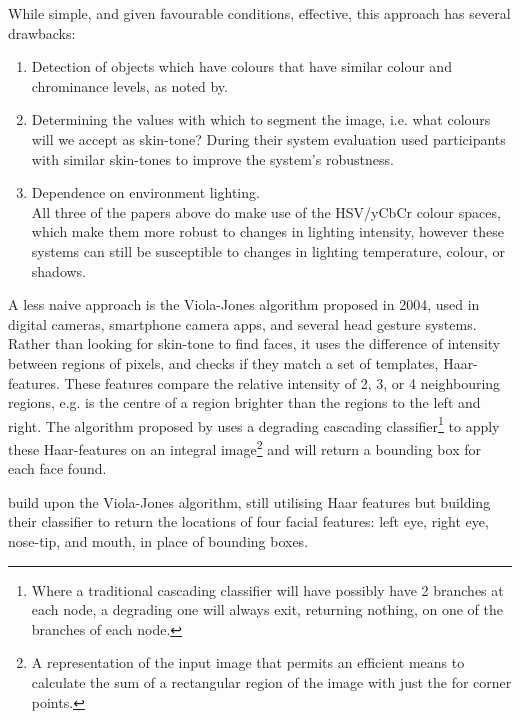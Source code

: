 While simple, and given favourable conditions, effective, this approach has several drawbacks:
\begin{enumerate}
    \item Detection of objects which have colours that have similar colour and chrominance levels, as noted by\citeauthor{bin2007rgb}\cite{bin2007rgb}.
    \item Determining the values with which to segment the image, i.e. what colours will we accept as skin-tone? During their system evaluation \citeauthor{chan2004face}\cite{chan2004face} used participants with similar skin-tones to improve the system's robustness.
    \item Dependence on environment lighting.\\
        All three of the papers above\cite{huang2004robust,bin2007rgb,chan2004face} do make use of the HSV/yCbCr colour spaces, which make them more robust to changes in lighting intensity, however these systems can still be susceptible to changes in lighting temperature, colour, or shadows.
\end{enumerate}\nl
A less naive approach is the Viola-Jones algorithm proposed in 2004\cite{viola2004robust}, used in digital cameras, smartphone camera apps, and several head gesture systems\cite{kim2017real, neto2012real, francone2011using}.
Rather than looking for skin-tone to find faces, it uses the difference of intensity between regions of pixels, and checks if they match a set of templates, Haar-features. These features compare the relative intensity of 2, 3, or 4 neighbouring regions, e.g. is the centre of a region brighter than the regions to the left and right. 
The algorithm proposed by \citeauthor{viola2004robust} uses a degrading cascading classifier\footnote{Where a traditional cascading classifier will have possibly have 2 branches at each node, a degrading one will always exit, returning nothing, on one of the branches of each node.} to apply these Haar-features on an integral image\footnote{A representation of the input image that permits an efficient means to calculate the sum of a rectangular region of the image with just the for corner points.} and will return a bounding box for each face found.

\citeauthor{kim2017real} build upon the Viola-Jones algorithm, still utilising Haar features but building their classifier to return the locations of four facial features: left eye, right eye, nose-tip, and mouth, in place of bounding boxes\cite{kim2017real}.

